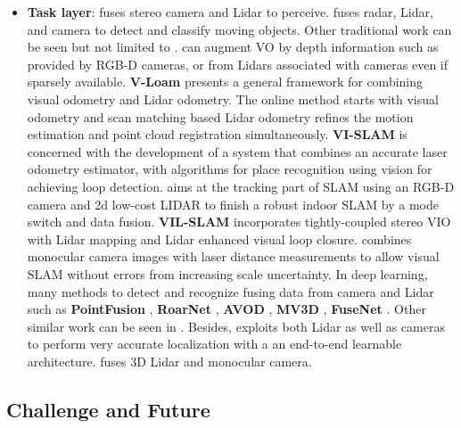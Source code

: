 \documentclass[journal,transmag]{IEEEtran}
\begin{document}
\begin{itemize}
    \item \textbf{Task layer}: \cite{aycard2011intersection} fuses stereo camera and Lidar to perceive. \cite{chavez2015multiple} fuses radar, Lidar, and camera to detect and classify moving objects. Other traditional work can be seen but not limited to \cite{cho2014multi} \cite{wang2011integrating}\cite{wan2018robust}. \cite{zhang2014real} can augment VO by depth information such as provided by RGB-D cameras, or from Lidars associated with cameras even if sparsely available. \textbf{V-Loam} \cite{zhang2015visual} presents a general framework for combining visual odometry and Lidar odometry. The online method starts with visual odometry and scan matching based Lidar odometry refines the motion estimation and point cloud registration simultaneously. \textbf{VI-SLAM} \cite{nava2018visual} is concerned with the development of a system that combines an accurate laser odometry estimator, with algorithms for place recognition using vision for achieving loop detection. \cite{xu2018slam} aims at the tracking part of SLAM using an RGB-D camera and 2d low-cost LIDAR to finish a robust indoor SLAM by a mode switch and data fusion. \textbf{VIL-SLAM} \cite{shao2019stereo} incorporates tightly-coupled stereo VIO with Lidar mapping and Lidar enhanced visual loop closure. \cite{andert2015lidar} combines monocular camera images with laser distance measurements to allow visual SLAM without errors from increasing scale uncertainty. In deep learning, many methods to detect and recognize fusing data from camera and Lidar such as \textbf{PointFusion} \cite{xu2018pointfusion}, \textbf{RoarNet} \cite{shin2018roarnet}, \textbf{AVOD} \cite{ku2018joint}, \textbf{MV3D} \cite{chen2017multi}, \textbf{FuseNet} \cite{hazirbas2016fusenet}. Other similar work can be seen in \cite{wang2018fusing}. Besides, \cite{liang2018deep} exploits both Lidar as well as cameras to perform very accurate localization with a  an end-to-end learnable architecture. \cite{gu20183} fuses 3D Lidar and monocular camera.

\end{itemize}

\subsection{Challenge and Future \cite{cadena2016past}}
\end{document}
